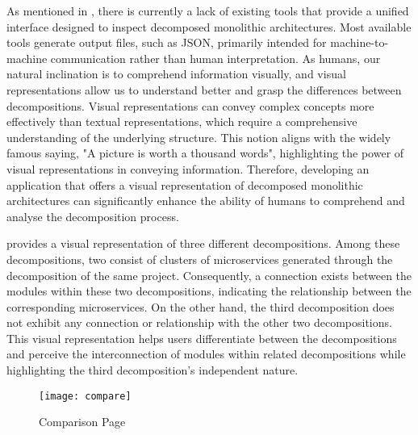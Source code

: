 As mentioned in , there is currently a lack of existing tools
that provide a unified interface designed to inspect decomposed monolithic
architectures. Most available tools generate output files, such as JSON,
primarily intended for machine-to-machine communication rather than human
interpretation. As humans, our natural inclination is to comprehend information
visually, and visual representations allow us to understand better and grasp
the differences between decompositions. Visual representations can convey
complex concepts more effectively than textual representations, which require a
comprehensive understanding of the underlying structure. This notion aligns
with the widely famous saying, "A picture is worth a thousand words",
highlighting the power of visual representations in conveying information.
Therefore, developing an application that offers a visual representation of
decomposed monolithic architectures can significantly enhance the ability of
humans to comprehend and analyse the decomposition process.

 provides a visual representation of three different
decompositions. Among these decompositions, two consist of clusters of
microservices generated through the decomposition of the same project.
Consequently, a connection exists between the modules within these two
decompositions, indicating the relationship between the corresponding
microservices. On the other hand, the third decomposition does not exhibit any
connection or relationship with the other two decompositions. This visual
representation helps users differentiate between the decompositions and
perceive the interconnection of modules within related decompositions while
highlighting the third decomposition's independent nature.

\begin{figure*}[!htb]
  \caption{Comparison Page} \label{fig:comparison_page}
  \centering
  \texttt{[image: compare]}
\end{figure*}
